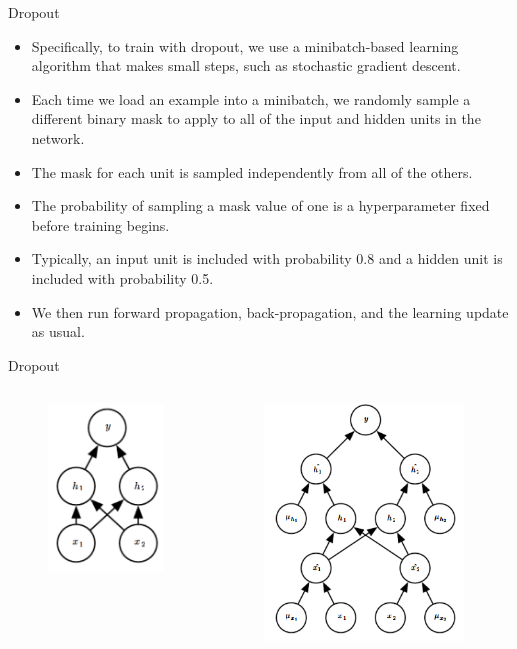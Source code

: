 \documentclass[10pt]{beamer}
\begin{document}
	\begin{frame}{Dropout}
		\begin{itemize}
			\item Specifically, to train with dropout, we use a minibatch-based learning algorithm that makes small steps, such as stochastic gradient descent.
			\pause
			\item Each time we load an example into a minibatch, we randomly sample a different binary mask to apply to all of the input and hidden units in the network.
			\pause
			\item The mask for each unit is sampled independently from all of the others. 
			\pause
			\item The probability of sampling a mask value of one is a hyperparameter fixed before training begins.
			\pause
			\item Typically, an input unit is included with probability 0.8 and a hidden unit is included with probability 0.5.
			\pause
			\item We then run forward propagation, back-propagation, and the learning update as usual.
		\end{itemize}
	\end{frame}
	
	\begin{frame}{Dropout}
		\begin{columns}
			\begin{figure}
				\includegraphics[height=12em]{figures/dropout-computation-graph-1.png}
			\end{figure}
			\begin{figure}
				\includegraphics[height=17em]{figures/dropout-computation-graph-2.png}
			\end{figure}
		\end{columns}
	\end{frame}
	
\end{document}
